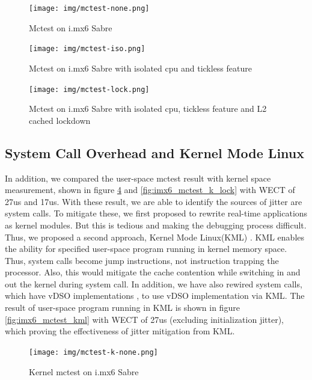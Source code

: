 \documentclass[conference]{IEEEtran}
\begin{document}
    \begin{figure} \centering \texttt{[image: img/mctest-none.png]} \caption{Mctest on i.mx6 Sabre}
    \label{fig:imx6_mctest_v} \end{figure}
    
    \begin{figure} \centering \texttt{[image: img/mctest-iso.png]} \caption{Mctest on i.mx6 Sabre with
    isolated cpu and tickless feature} \label{fig:imx6_mctest_iso} \end{figure}
    
    \begin{figure} \centering \texttt{[image: img/mctest-lock.png]} \caption{Mctest on i.mx6 Sabre with
    isolated cpu, tickless feature and L2 cached lockdown} \label{fig:imx6_mctest_lock} \end{figure}
    
\subsection{System Call Overhead and Kernel Mode Linux}

    In addition, we compared the user-space mctest result with kernel space measurement, shown in figure
    \ref{fig:imx6_mctest_k_v} and \ref{fig:imx6_mctest_k_lock} with WECT of 27us and 17us. With these result, we are
    able to identify the sources of jitter are system calls. To mitigate these, we first proposed to rewrite real-time
    applications as kernel modules. But this is tedious and making the debugging process difficult. Thus, we proposed a
    second approach, Kernel Mode Linux(KML) \cite{KML} \cite{KMLConf}. KML enables the ability for specified user-space
    program running in kernel memory space. Thus, system calls become jump instructions, not instruction trapping the
    processor. Also, this would mitigate the cache contention while switching in and out the kernel during system call.
    In addition, we have also rewired system calls, which have vDSO implementations \cite{vDSO}, to use vDSO
    implementation via KML. The result of user-space program running in KML is shown in figure \ref{fig:imx6_mctest_kml}
    with WECT of 27us (excluding initialization jitter), which proving the effectiveness of jitter mitigation from KML.

    \begin{figure} \centering \texttt{[image: img/mctest-k-none.png]} \caption{Kernel mctest on i.mx6 Sabre}
    \label{fig:imx6_mctest_k_v} \end{figure}
    
\end{document}
